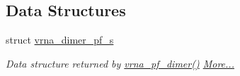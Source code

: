 \subsection*{Data Structures}
\begin{DoxyCompactItemize}
\item 
struct \mbox{\hyperlink{group__part__func__global_structvrna__dimer__pf__s}{vrna\+\_\+dimer\+\_\+pf\+\_\+s}}
\begin{DoxyCompactList}\small\item\em Data structure returned by \mbox{\hyperlink{group__part__func__global_ga4e5c7d06c302a7c59fc0d64dc142ca63}{vrna\+\_\+pf\+\_\+dimer()}}  \mbox{\hyperlink{group__part__func__global_structvrna__dimer__pf__s}{More...}}\end{DoxyCompactList}\end{DoxyCompactItemize}
